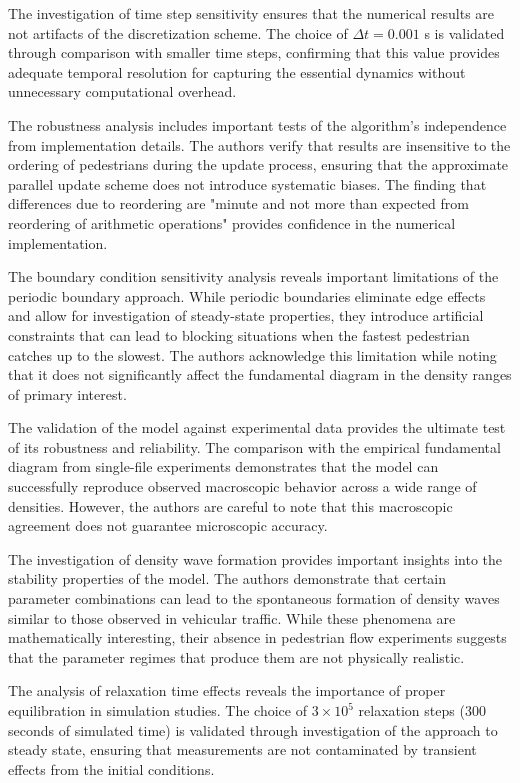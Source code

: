 \documentclass[12pt,a4paper]{article}
\begin{document}
The investigation of time step sensitivity ensures that the numerical results are not artifacts of the discretization scheme. The choice of $\Delta t = 0.001$ s is validated through comparison with smaller time steps, confirming that this value provides adequate temporal resolution for capturing the essential dynamics without unnecessary computational overhead.

The robustness analysis includes important tests of the algorithm's independence from implementation details. The authors verify that results are insensitive to the ordering of pedestrians during the update process, ensuring that the approximate parallel update scheme does not introduce systematic biases. The finding that differences due to reordering are "minute and not more than expected from reordering of arithmetic operations" provides confidence in the numerical implementation.

The boundary condition sensitivity analysis reveals important limitations of the periodic boundary approach. While periodic boundaries eliminate edge effects and allow for investigation of steady-state properties, they introduce artificial constraints that can lead to blocking situations when the fastest pedestrian catches up to the slowest. The authors acknowledge this limitation while noting that it does not significantly affect the fundamental diagram in the density ranges of primary interest.

The validation of the model against experimental data provides the ultimate test of its robustness and reliability. The comparison with the empirical fundamental diagram from single-file experiments demonstrates that the model can successfully reproduce observed macroscopic behavior across a wide range of densities. However, the authors are careful to note that this macroscopic agreement does not guarantee microscopic accuracy.

The investigation of density wave formation provides important insights into the stability properties of the model. The authors demonstrate that certain parameter combinations can lead to the spontaneous formation of density waves similar to those observed in vehicular traffic. While these phenomena are mathematically interesting, their absence in pedestrian flow experiments suggests that the parameter regimes that produce them are not physically realistic.

The analysis of relaxation time effects reveals the importance of proper equilibration in simulation studies. The choice of $3 \times 10^5$ relaxation steps (300 seconds of simulated time) is validated through investigation of the approach to steady state, ensuring that measurements are not contaminated by transient effects from the initial conditions.
\end{document}
